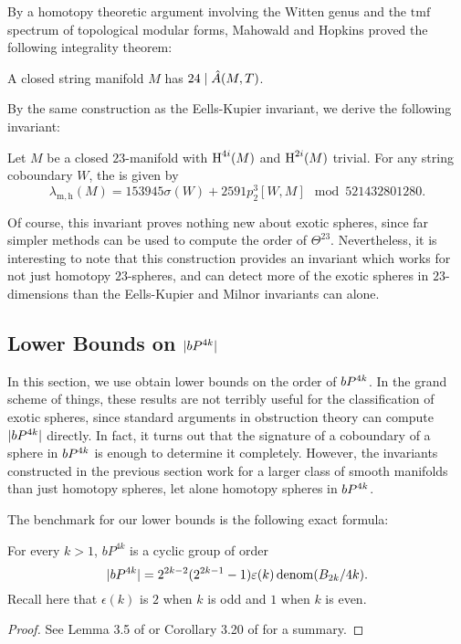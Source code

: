 By a homotopy theoretic argument involving the Witten genus and the $\mathrm{tmf}$ spectrum of topological modular forms, Mahowald and Hopkins proved the following integrality theorem:
\begin{theorem}
	A closed string manifold $M$ has $24\mid \hat{A}(M,T)$.
\end{theorem}

By the same construction as the Eells-Kupier invariant, we derive the following invariant:

\begin{corollary}
	Let $M$ be a closed $23$-manifold with $\operatorname{H}^{4i}(M)$ and $\operatorname{H}^{2i}(M)$ trivial. For any string coboundary $W$, the  is given by
	\[
		\lambda_{\mathrm{m,h}}(M) = 153945\sigma(W) + 2591p_2^3[W,M]\mod 521432801280.
	\]
\end{corollary}

Of course, this invariant proves nothing new about exotic spheres, since far simpler methods can be used to compute the order of $\Theta^{23}$. Nevertheless, it is interesting to note that this construction provides an invariant which works for not just homotopy $23$-spheres, and can detect more of the exotic spheres in $23$-dimensions than the Eells-Kupier and Milnor invariants can alone.

\subsection{Lower Bounds on \texorpdfstring{$|bP^{4k}|$}{|bP^4k|}}\label{sec:lower-bounds}

In this section, we use obtain lower bounds on the order of $bP^{4k}$. In the grand scheme of things, these results are not terribly useful for the classification of exotic spheres, since standard arguments in obstruction theory can compute $|bP^{4k}|$ directly. In fact, it turns out that the signature of a coboundary of a sphere in $bP^{4k}$ is enough to determine it completely. However, the invariants constructed in the previous section work for a larger class of smooth manifolds than just homotopy spheres, let alone homotopy spheres in $bP^{4k}$. 

The benchmark for our lower bounds is the following exact formula:

\begin{theorem}\label{thm:kervaire-milnor}
	For every $k>1$, $bP^{4k}$ is a cyclic group of order
	\[
		|bP^{4k}| =2^{2k-2}(2^{2k-1}-1)\varepsilon(k)\operatorname{denom}(B_{2k}/4k).
	\]
	Recall here that $\epsilon(k)$ is $2$ when $k$ is odd and $1$ when $k$ is even.
\end{theorem}
\begin{proof}
	See Lemma 3.5 of \cite{milnor1958manifolds} or Corollary 3.20 of \cite{levine1985lectures} for a summary.
\end{proof}

